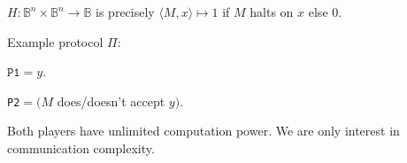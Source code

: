 \begin{example}[$A_{TM}$]
\(H : \mathbb{B}^n \times \mathbb{B}^n \to \mathbb{B}\)
is precisely
\(\langle M, x \rangle \mapsto 1\)
if $M$ halts on $x$ else 0.
\end{example}
\pause
Example protocol $\Pi$:\\
\begin{rightbubbles}
{\footnotesize $\texttt{P1}=y$.}
\end{rightbubbles}
\pause
\begin{leftbubbles}
\texttt{P2}$=(M$ does/doesn't accept $y)$.
\end{leftbubbles}
\pause
Both players have unlimited computation power.
We are only interest in communication complexity.